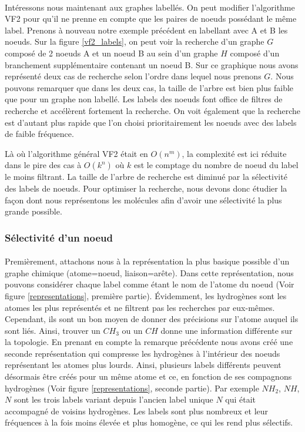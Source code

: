 \documentclass[12pt,french,twoside]{report}
\begin{document}
\paragraph{}Intéressons nous maintenant aux graphes labellés.
On peut modifier l'algorithme VF2 pour qu'il ne prenne en compte que les paires de noeuds possédant le même label.
Prenons à nouveau notre exemple précédent en labellant avec A et B les noeuds.
Sur la figure \ref{vf2_labels}, on peut voir la recherche d'un graphe $G$ composé de 2 noeuds A et un noeud B au sein d'un graphe $H$
composé d'un branchement supplémentaire contenant un noeud B.
Sur ce graphique nous avons représenté deux cas de recherche selon l'ordre dans lequel nous prenons $G$.
Nous pouvons remarquer que dans les deux cas, la taille de l'arbre est bien plus faible que pour un graphe non labellé.
Les labels des noeuds font office de filtres de recherche et accélèrent fortement la recherche.
On voit également que la recherche est d'autant plus rapide que l'on choisi prioritairement les noeuds avec des labels de faible
fréquence.

Là où l'algorithme général VF2 était en $O(n^m)$, la complexité est ici réduite dans le pire des cas à $O(k^n)$ où $k$ est le
comptage du nombre de noeud du label le moins filtrant.
La taille de l'arbre de recherche est diminué par la sélectivité des labels de noeuds.
Pour optimiser la recherche, nous devons donc étudier la façon dont nous représentons les molécules afin d'avoir une sélectivité
la plus grande possible.

\subsubsection{Sélectivité d'un noeud}

\paragraph{}Premièrement, attachons nous à la représentation la plus basique possible d'un graphe chimique (atome=noeud,
liaison=arête). Dans cette représentation, nous pouvons considérer chaque label comme étant le nom de l'atome du noeud (Voir
figure \ref{representations}, première partie). Évidemment, les hydrogènes sont les atomes les plus représentés et ne filtrent
pas les recherches par eux-mêmes. Cependant, ils sont un bon moyen de donner des précisions sur l'atome auquel ils sont liés.
Ainsi, trouver un $CH_{3}$ ou un $CH$ donne une information différente sur la topologie.
En prenant en compte la remarque précédente nous avons créé une seconde représentation qui compresse les hydrogènes à l'intérieur
des noeuds représentant les atomes plus lourds.
Ainsi, plusieurs labels différents peuvent
désormais être créés pour un même atome et ce, en fonction de ses compagnons hydrogènes (Voir figure \ref{representations},
seconde partie). Par exemple $NH_2$, $NH$, $N$ sont les
trois labels variant depuis l'ancien label unique $N$ qui était accompagné de voisins hydrogènes. Les labels sont plus nombreux et leur fréquences à la fois moins élevée et plus homogène, ce qui les rend plus sélectifs.
\end{document}
